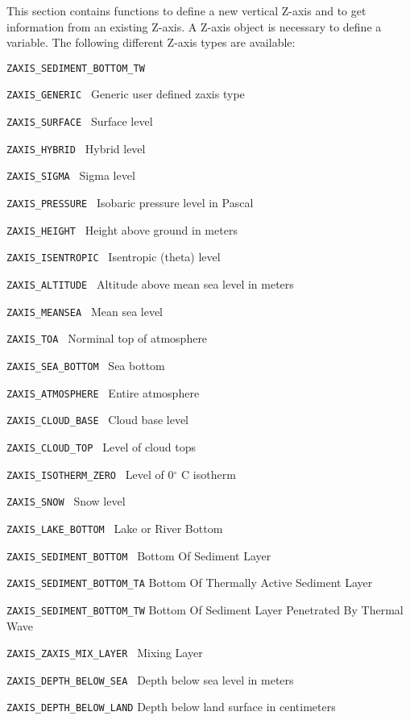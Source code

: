 This section contains functions to define a new vertical Z-axis
and to get information from an existing Z-axis.
A Z-axis object is necessary to define a variable.
The following different Z-axis types are available:

\vspace*{3mm}
\hspace*{8mm}\begin{minipage}{15cm}
\begin{deflist}{\large\texttt{ZAXIS\_SEDIMENT\_BOTTOM\_TW \ \ }}
\item[\large\texttt{ZAXIS\_GENERIC           }]  Generic user defined zaxis type
\item[\large\texttt{ZAXIS\_SURFACE           }]  Surface level
\item[\large\texttt{ZAXIS\_HYBRID            }]  Hybrid level
\item[\large\texttt{ZAXIS\_SIGMA              }]  Sigma level
\item[\large\texttt{ZAXIS\_PRESSURE          }]  Isobaric pressure level in Pascal
\item[\large\texttt{ZAXIS\_HEIGHT            }]  Height above ground in meters
\item[\large\texttt{ZAXIS\_ISENTROPIC      }]  Isentropic (theta) level
\item[\large\texttt{ZAXIS\_ALTITUDE          }]  Altitude above mean sea level in meters
\item[\large\texttt{ZAXIS\_MEANSEA          }]  Mean sea level
\item[\large\texttt{ZAXIS\_TOA                  }]  Norminal top of atmosphere
\item[\large\texttt{ZAXIS\_SEA\_BOTTOM  }]  Sea bottom
\item[\large\texttt{ZAXIS\_ATMOSPHERE   }]  Entire atmosphere
\item[\large\texttt{ZAXIS\_CLOUD\_BASE        }]  Cloud base level
\item[\large\texttt{ZAXIS\_CLOUD\_TOP         }]  Level of cloud tops
\item[\large\texttt{ZAXIS\_ISOTHERM\_ZERO    }]  Level of 0$^{\circ}$ C isotherm
\item[\large\texttt{ZAXIS\_SNOW                   }]  Snow level
\item[\large\texttt{ZAXIS\_LAKE\_BOTTOM               }]  Lake or River Bottom
\item[\large\texttt{ZAXIS\_SEDIMENT\_BOTTOM        }]  Bottom Of Sediment Layer
\item[\large\texttt{ZAXIS\_SEDIMENT\_BOTTOM\_TA}]  Bottom Of Thermally Active Sediment Layer
\item[\large\texttt{ZAXIS\_SEDIMENT\_BOTTOM\_TW}]  Bottom Of Sediment Layer Penetrated By Thermal Wave
\item[\large\texttt{ZAXIS\_ZAXIS\_MIX\_LAYER          }]  Mixing Layer
\item[\large\texttt{ZAXIS\_DEPTH\_BELOW\_SEA }]  Depth below sea level in meters
\item[\large\texttt{ZAXIS\_DEPTH\_BELOW\_LAND}]  Depth below land surface in centimeters
\end{deflist}
\end{minipage}
